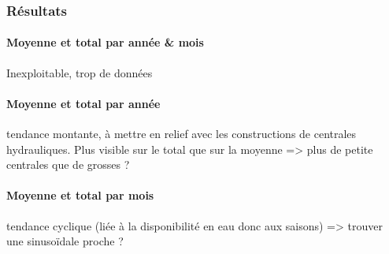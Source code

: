 \documentclass[english,12pt,twoside,a4paper]{report}
\begin{document}
\subsubsection{Résultats}
\paragraph{Moyenne et total par année \& mois} Inexploitable, trop de données

\paragraph{Moyenne et total par année} tendance montante, à mettre en relief avec les constructions de centrales hydrauliques. Plus visible sur le total que sur la moyenne => plus de petite centrales que de grosses ?

\paragraph{Moyenne et total par mois} tendance cyclique (liée à la disponibilité en eau donc aux saisons) => trouver une sinusoïdale proche ?
\end{document}
